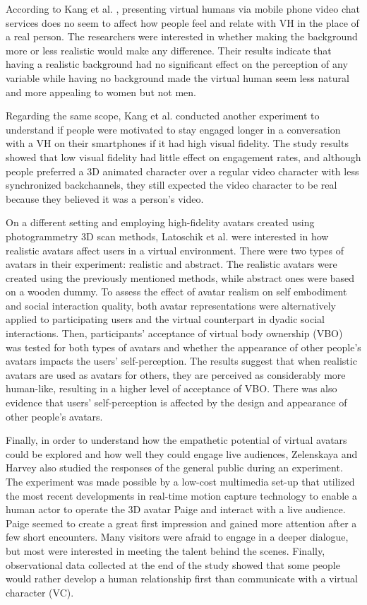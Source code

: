 According to Kang et al. \cite{KAN16}, presenting virtual humans via mobile phone video chat services does no seem to affect how people feel and relate with VH in the place of a real person. The researchers were interested in whether making the background more or less realistic would make any difference. Their results indicate that having a realistic background had no significant effect on the perception of any variable while having no background made the virtual human seem less natural and more appealing to women but not men.

Regarding the same scope, Kang et al. \cite{KAN16A} conducted another experiment to understand if people were motivated to stay engaged longer in a conversation with a VH on their smartphones if it had high visual fidelity. The study results showed that low visual fidelity had little effect on engagement rates, and although people preferred a 3D animated character over a regular video character with less synchronized backchannels, they still expected the video character to be real because they believed it was a person's video.

On a different setting and employing high-fidelity avatars created using photogrammetry 3D scan methods, Latoschik et al. \cite{LAT17} were interested in how realistic avatars affect users in a virtual environment. There were two types of avatars in their experiment: realistic and abstract. The realistic avatars were created using the previously mentioned methods, while abstract ones were based on a wooden dummy. To assess the effect of avatar realism on self embodiment and social interaction quality, both avatar representations were alternatively applied to participating users and the virtual counterpart in dyadic social interactions. Then, participants' acceptance of virtual body ownership (VBO) was tested for both types of avatars and whether the appearance of other people's avatars impacts the users' self-perception. The results suggest that when realistic avatars are used as avatars for others, they are perceived as considerably more human-like, resulting in a higher level of acceptance of VBO. There was also evidence that users' self-perception is affected by the design and appearance of other people's avatars.

Finally, in order to understand how the empathetic potential of virtual avatars could be explored and how well they could engage live audiences, Zelenskaya and Harvey \cite{ZEL19} also studied the responses of the general public during an experiment. The experiment was made possible by a low-cost multimedia set-up that utilized the most recent developments in real-time motion capture technology to enable a human actor to operate the 3D avatar Paige and interact with a live audience. Paige seemed to create a great first impression and gained more attention after a few short encounters. Many visitors were afraid to engage in a deeper dialogue, but most were interested in meeting the talent behind the scenes. Finally, observational data collected at the end of the study showed that some people would rather develop a human relationship first than communicate with a virtual character (VC).

